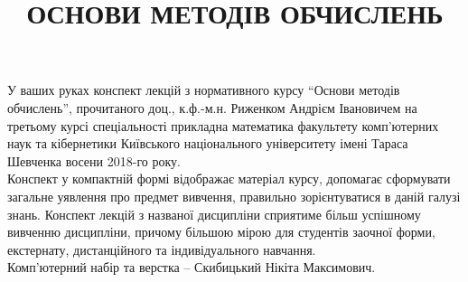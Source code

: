 \documentclass[a5paper, 10pt]{article}
\title{{\Huge ОСНОВИ МЕТОДІВ ОБЧИСЛЕНЬ}}
\date{}
\numberwithin{equation}{subsection}
\theoremstyle{definition}
\begin{document}
\maketitle \thispagestyle{empty} \newpage 

У ваших руках конспект лекцій з нормативного курсу ``Основи методів обчислень'', прочитаного доц., к.ф.-м.н. Риженком Андрієм Івановичем на третьому курсі спеціальності прикладна математика факультету комп'ютерних наук та кібернетики Київського національного університету імені Тараса Шевченка восени 2018-го року. \\

Конспект у компактній формі відображає матеріал курсу, допомагає сформувати загальне уявлення про предмет вивчення, правильно зорієнтуватися в даній галузі знань. Конспект лекцій з названої дисципліни сприятиме більш успішному вивченню дисципліни, причому більшою мірою для студентів заочної форми, екстернату, дистанційного та індивідуального навчання. \\

Комп'ютерний набір та верстка -- Скибицький Нікіта Максимович. \newpage

\tableofcontents \newpage










\end{document}
